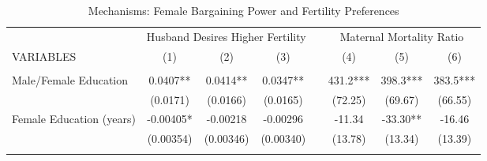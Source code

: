 \begin{landscape}\begin{table}[htpb!]\begin{center}
\caption{Mechanisms: Female Bargaining Power and Fertility Preferences}
\label{MMRtab:Mechanisms}\begin{tabular}{lcccp{1mm}ccc}\toprule
& \multicolumn{3}{c}{Husband Desires Higher Fertility}&&\multicolumn{3}{c}{Maternal Mortality Ratio}\\VARIABLES & (1)&(2)&(3)&&(4)&(5)&(6)\\ \cmidrule(r){1-4} \cmidrule(r){6-8}\begin{footnotesize}\end{footnotesize}&\begin{footnotesize}\end{footnotesize}&\begin{footnotesize}\end{footnotesize}&\begin{footnotesize}\end{footnotesize}&\begin{footnotesize}\end{footnotesize}&\begin{footnotesize}\end{footnotesize}&\begin{footnotesize}\end{footnotesize}\\ 
Male/Female Education   &0.0407**&0.0414**&0.0347**                       &&431.2***&398.3***&383.5***\\ 
                        &(0.0171)&(0.0166)&(0.0165)                       &&(72.25)&(69.67)&(66.55)\\ 
Female Education (years)&-0.00405*&-0.00218&-0.00296                       &&-11.34&-33.30**&-16.46\\ 
                        &(0.00354)&(0.00346)&(0.00340)                       &&(13.78)&(13.34)&(13.39)\\ 
\begin{footnotesize}\end{footnotesize}&\begin{footnotesize}\end{footnotesize}&\begin{footnotesize}\end{footnotesize}&\begin{footnotesize}\end{footnotesize}&\begin{footnotesize}\end{footnotesize}&\begin{footnotesize}\end{footnotesize}\\ 

\end{tabular}
\end{center}
\end{table}
\end{landscape}
